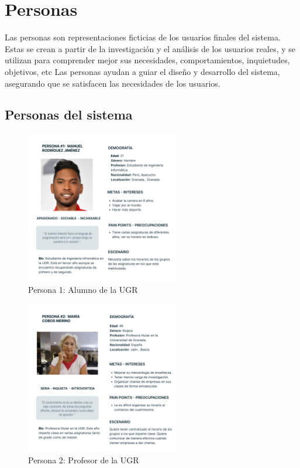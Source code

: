 \section{Personas}

Las personas son representaciones ficticias de los usuarios finales del sistema. Estas se crean a partir de la investigación y el análisis de los usuarios reales, y se utilizan para comprender mejor sus necesidades,
 comportamientos, inquietudes, objetivos, etc \newline
Las personas ayudan a guiar el diseño y desarrollo del sistema, asegurando que se satisfacen las necesidades de los usuarios.

\subsection{Personas del sistema}

\begin{figure}[H]
    \centering
    \includegraphics[width=0.6\textwidth]{figures/04_persona_1.png}
    \caption{Persona 1: Alumno de la UGR}
    \label{fig:persona_1}
\end{figure}

\begin{figure}[H]
    \centering
    \includegraphics[width=0.6\textwidth]{figures/04_persona_2.png}
    \caption{Persona 2: Profesor de la UGR}
    \label{fig:persona_2}
\end{figure}

